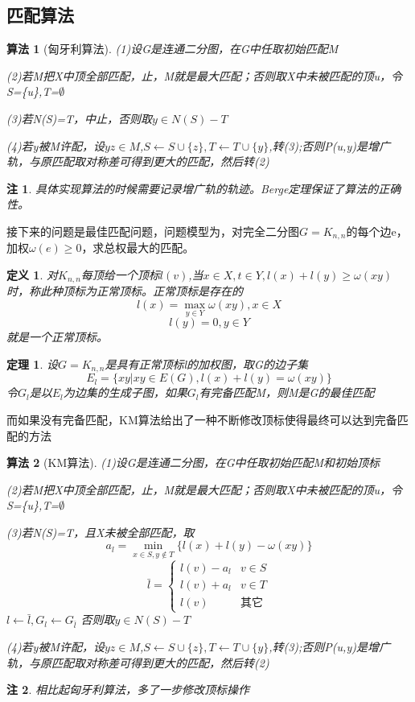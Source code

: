 \documentclass[UTF8]{ctexart}
\newtheorem{dfnt}{定义}
\newtheorem{thr}{定理}
\newtheorem*{note}{注}
\newtheorem{alg}{算法}
\begin{document}
\subsection{匹配算法}
\begin{alg}[匈牙利算法]
\item (1)设G是连通二分图，在G中任取初始匹配M
\item (2)若M把X中顶全部匹配，止，M就是最大匹配；否则取X中未被匹配的顶u，令S=\{u\},T=$\emptyset$
\item (3)若N(S)=T，中止，否则取$y \in N(S)-T$
\item (4)若y被M许配，设$yz \in M$,$S \leftarrow S\cup\{z\},T \leftarrow T \cup \{y\}$,转(3);否则P(u,y)是增广轨，与原匹配取对称差可得到更大的匹配，然后转(2)
\end{alg}
\begin{note}
具体实现算法的时候需要记录增广轨的轨迹。Berge定理保证了算法的正确性。
\end{note}
接下来的问题是最佳匹配问题，问题模型为，对完全二分图$G = K_{n,n}$的每个边e，加权$\omega (e) \geq 0$，求总权最大的匹配。
\begin{dfnt}
对$K_{n,n}$每顶给一个顶标$l(v)$,当$x \in X,t \in Y,l(x)+l(y) \geq \omega(xy)$时，称此种顶标为正常顶标。正常顶标是存在的$$l(x)=\max \limits_{y \in Y} \omega(xy) ,x \in X$$
$$l(y) = 0, y\in Y$$就是一个正常顶标。
\end{dfnt}
\begin{thr}
设$G=K_{n,n}$是具有正常顶标l的加权图，取G的边子集$$E_l = \{xy | xy \in E(G),l(x)+l(y)=\omega (xy)\}$$令$G_l$是以$E_l$为边集的生成子图，如果$G_l$有完备匹配M，则M是G的最佳匹配
\end{thr}
而如果没有完备匹配，KM算法给出了一种不断修改顶标使得最终可以达到完备匹配的方法
\begin{alg}[KM算法]
\item (1)设G是连通二分图，在G中任取初始匹配M和初始顶标
\item (2)若M把X中顶全部匹配，止，M就是最大匹配；否则取X中未被匹配的顶u，令S=\{u\},T=$\emptyset$
\item (3)若N(S)=T，且X未被全部匹配，取$$a_l = \min \limits_{x \in S ,y\notin T}\{l(x)+l(y)-\omega(xy)\}$$ 
\[\bar{l} =\left \{ \begin{array}{ll} l(v)-a_l & v \in S \\l(v)+a_l &v \in T \\l(v) &其它 \end{array}\right.\]
$l \leftarrow \bar{l},G_l \leftarrow G_{\bar{l}}$
否则取$y \in N(S)-T$
\item (4)若y被M许配，设$yz \in M$,$S \leftarrow S\cup\{z\},T \leftarrow T \cup \{y\}$,转(3);否则P(u,y)是增广轨，与原匹配取对称差可得到更大的匹配，然后转(2)
\end{alg}
\begin{note}
相比起匈牙利算法，多了一步修改顶标操作
\end{note}
\end{document}
